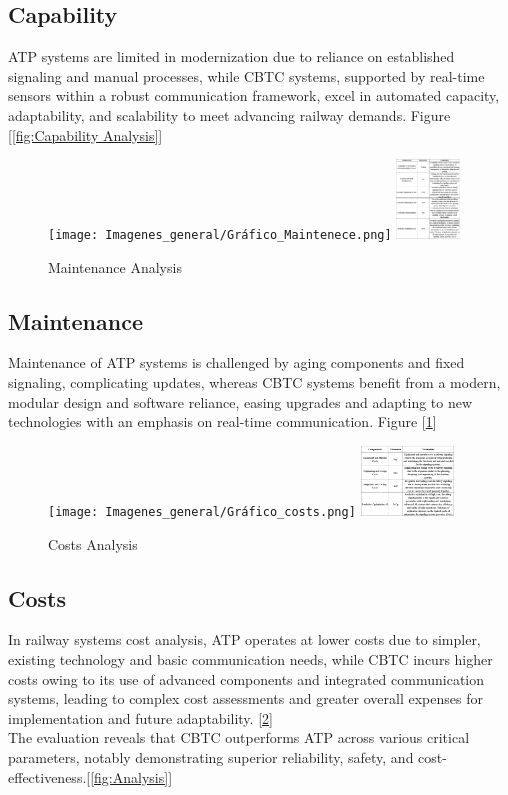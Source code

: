 \documentclass[conference]{IEEEtran}
\begin{document}
\subsection{Capability}
ATP systems are limited in modernization due to reliance on established signaling and manual processes, while CBTC systems, supported by real-time sensors within a robust communication framework, excel in automated capacity, adaptability, and scalability to meet advancing railway demands. Figure [\ref{fig:Capability Analysis}]\\
\begin{figure}[ht]
    \centering
        \texttt{[image: Imagenes\_general/Gráfico\_Maintenece.png]}
    \includegraphics[width=0.15\textwidth,scale=1]{Imagenes_general/Tabla_Maintenece.jpg}
    \caption{Maintenance Analysis}
    \label{fig:Maintenance Analysis}
\end{figure}
\subsection{Maintenance}
Maintenance of ATP systems is challenged by aging components and fixed signaling, complicating updates, whereas CBTC systems benefit from a modern, modular design and software reliance, easing upgrades and adapting to new technologies with an emphasis on real-time communication. Figure [\ref{fig:Maintenance Analysis}]\\

\begin{figure}[ht]
    \centering
        \texttt{[image: Imagenes\_general/Gráfico\_costs.png]}
    \includegraphics[width=0.22\textwidth,scale=1]{Imagenes_general/tablas_costs.jpg}
    \caption{Costs Analysis}
    \label{fig:Costs Analysis}
\end{figure}
\subsection{Costs}
In railway systems cost analysis, ATP operates at lower costs due to simpler, existing technology and basic communication needs, while CBTC incurs higher costs owing to its use of advanced components and integrated communication systems, leading to complex cost assessments and greater overall expenses for implementation and future adaptability. [\ref{fig:Costs Analysis}]\\
The evaluation reveals that CBTC outperforms ATP across various critical parameters, notably demonstrating superior reliability, safety, and cost-effectiveness.[\ref{fig:Analysis}]
\end{document}
